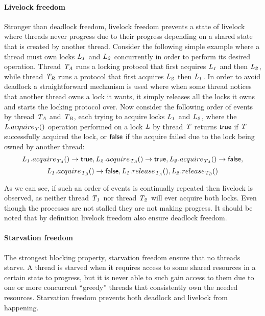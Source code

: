 \paragraph{Livelock freedom}
Stronger than deadlock freedom, livelock freedom prevents a state of livelock where threads
never progress due to their progress depending on a shared state that is created by another thread.
Consider the following simple example
where a thread must own locks $\ms{L_1}$ and $\ms{L_2}$ concurrently in order to perform its desired operation.
Thread $\ms{T_A}$ runs a locking protocol that first acquires $\ms{L_1}$ and then $\ms{L_2}$, while thread
$\ms{T_B}$ runs a protocol that first acquires $\ms{L_2}$ then $\ms{L_1}$.
In order to avoid deadlock a straightforward mechanism is used where when some thread notices that another thread owns a lock it wants, it
simply releases all the locks it owns and starts the locking protocol over.
Now consider the following order of events by thread $\ms{T_A}$ and $\ms{T_B}$, each trying to acquire locks $\ms{L_1}$ and $\ms{L_2}$, where the $\ms{L}.acquire_{\ms{T}}()$ operation
performed on a lock $\ms{L}$ by thread $\ms{T}$ returns $\lit{true}$ if $\ms{T}$ successfully acquired the lock, or $\lit{false}$
if the acquire failed due to the lock being owned by another thread:
$$\ms{L_1}.acquire_{\ms{T_A}}() \to \lit{true}, \ms{L_2}.acquire_{\ms{T_B}}() \to \lit{true}, \ms{L_2}.acquire_{\ms{T_A}}() \to \lit{false},$$
$$\ms{L_1}.acquire_{\ms{T_B}}() \to \lit{false}, \ms{L_1}.release_{\ms{T_A}}(), \ms{L_2}.release_{\ms{T_B}}()$$





As we can see, if such an order of events is continually repeated then livelock is observed, as neither
thread $\ms{T_1}$ nor thread $\ms{T_2}$ will ever acquire both locks.
Even though the processes are not stalled they are not making progress.
It should be noted that by definition livelock freedom also ensure deadlock freedom.

\paragraph{Starvation freedom}
The strongest blocking property, starvation freedom ensure that no threads starve.
A thread is starved when it requires access to some shared resources in a certain state to progress, but
it is never able to such gain access to them due to one or more concurrent ``greedy'' threads
that consistently own the needed resources.
Starvation freedom prevents both deadlock and livelock from happening.


